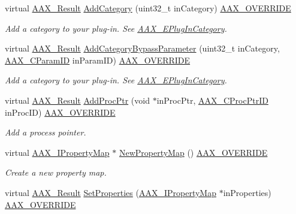 \begin{DoxyCompactItemize}
virtual \hyperlink{a00149_a4d8f69a697df7f70c3a8e9b8ee130d2f}{A\+A\+X\+\_\+\+Result} \hyperlink{a00134_a94e83936e8c83577fe2f31a8ed0ca40d}{Add\+Category} (uint32\+\_\+t in\+Category) \hyperlink{a00149_ac2f24a5172689ae684344abdcce55463}{A\+A\+X\+\_\+\+O\+V\+E\+R\+R\+I\+D\+E}
\begin{DoxyCompactList}\small\item\em Add a category to your plug-\/in. See \hyperlink{a00206_aef9637518fb1ac0e2f403444c73aba4a}{A\+A\+X\+\_\+\+E\+Plug\+In\+Category}. \end{DoxyCompactList}\item 
virtual \hyperlink{a00149_a4d8f69a697df7f70c3a8e9b8ee130d2f}{A\+A\+X\+\_\+\+Result} \hyperlink{a00134_a6a18a915abfc0523ea4e2ba914e8e6e9}{Add\+Category\+Bypass\+Parameter} (uint32\+\_\+t in\+Category, \hyperlink{a00149_a1440c756fe5cb158b78193b2fc1780d1}{A\+A\+X\+\_\+\+C\+Param\+I\+D} in\+Param\+I\+D) \hyperlink{a00149_ac2f24a5172689ae684344abdcce55463}{A\+A\+X\+\_\+\+O\+V\+E\+R\+R\+I\+D\+E}
\begin{DoxyCompactList}\small\item\em Add a category to your plug-\/in. See \hyperlink{a00206_aef9637518fb1ac0e2f403444c73aba4a}{A\+A\+X\+\_\+\+E\+Plug\+In\+Category}. \end{DoxyCompactList}\item 
virtual \hyperlink{a00149_a4d8f69a697df7f70c3a8e9b8ee130d2f}{A\+A\+X\+\_\+\+Result} \hyperlink{a00134_a227df126e64b23d86cfa68f0127421c0}{Add\+Proc\+Ptr} (void $\ast$in\+Proc\+Ptr, \hyperlink{a00163_af0682195d377392ad356fd2b00c36892}{A\+A\+X\+\_\+\+C\+Proc\+Ptr\+I\+D} in\+Proc\+I\+D) \hyperlink{a00149_ac2f24a5172689ae684344abdcce55463}{A\+A\+X\+\_\+\+O\+V\+E\+R\+R\+I\+D\+E}
\begin{DoxyCompactList}\small\item\em Add a process pointer. \end{DoxyCompactList}\item 
virtual \hyperlink{a00112}{A\+A\+X\+\_\+\+I\+Property\+Map} $\ast$ \hyperlink{a00134_ab4c840f497fc127987b10da6b6ee74e9}{New\+Property\+Map} () \hyperlink{a00149_ac2f24a5172689ae684344abdcce55463}{A\+A\+X\+\_\+\+O\+V\+E\+R\+R\+I\+D\+E}
\begin{DoxyCompactList}\small\item\em Create a new property map. \end{DoxyCompactList}\item 
virtual \hyperlink{a00149_a4d8f69a697df7f70c3a8e9b8ee130d2f}{A\+A\+X\+\_\+\+Result} \hyperlink{a00134_a15107ea151d6ece6b6f40b4b23f2cee9}{Set\+Properties} (\hyperlink{a00112}{A\+A\+X\+\_\+\+I\+Property\+Map} $\ast$in\+Properties) \hyperlink{a00149_ac2f24a5172689ae684344abdcce55463}{A\+A\+X\+\_\+\+O\+V\+E\+R\+R\+I\+D\+E}

\end{DoxyCompactItemize}
